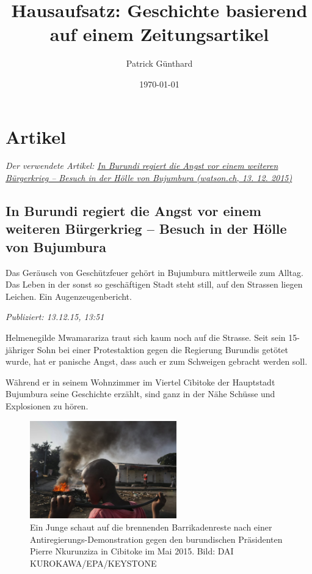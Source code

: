 \documentclass{article}
\title{Hausaufsatz: Geschichte basierend auf einem Zeitungsartikel}
\author{Patrick Günthard}
\date{\today}
\begin{document}
	
	
	\maketitle
	\section{Artikel}
	
	\textit{Der verwendete Artikel:  \href{http://wat.is/-y0EbCyiC}{In Burundi regiert die Angst vor einem weiteren Bürgerkrieg – Besuch in der Hölle von Bujumbura (watson.ch, 13. 12. 2015)}}
	
	\subsection*{In Burundi regiert die Angst vor einem weiteren Bürgerkrieg – Besuch in der Hölle von Bujumbura}
	
	Das Geräusch von Geschützfeuer gehört in Bujumbura mittlerweile zum Alltag. Das Leben in der sonst so geschäftigen Stadt steht still, auf den Strassen liegen Leichen. Ein Augenzeugenbericht.
	
	\textit{Publiziert: 13.12.15, 13:51 }
	
	Helmenegilde Mwamarariza traut sich kaum noch auf die Strasse. Seit sein 15-jähriger Sohn bei einer Protestaktion gegen die Regierung Burundis getötet wurde, hat er panische Angst, dass auch er zum Schweigen gebracht werden soll.
	
	Während er in seinem Wohnzimmer im Viertel Cibitoke der Hauptstadt Bujumbura seine Geschichte erzählt, sind ganz in der Nähe Schüsse und Explosionen zu hören.
	
	\begin{figure}
	 \centering
	\includegraphics[width=180pt]{img/img1}
	\caption{Ein Junge schaut auf die brennenden Barrikadenreste nach einer Antiregierungs-Demonstration gegen den burundischen Präsidenten Pierre Nkurunziza in Cibitoke im Mai 2015. 
	Bild: DAI KUROKAWA/EPA/KEYSTONE}
	\end{figure}
	
\end{document}

